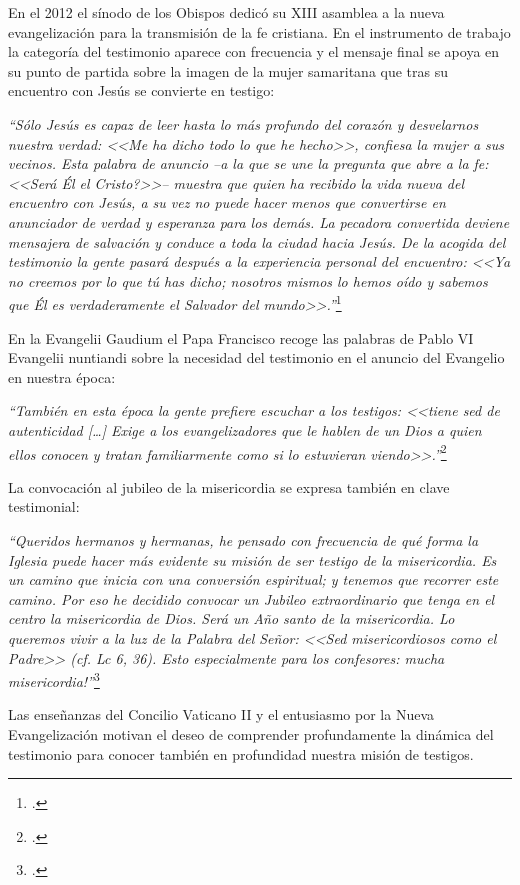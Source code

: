 \documentclass[../main.tex]{subfiles}
\begin{document}
En el 2012 el sínodo de los Obispos dedicó su XIII asamblea a la nueva evangelización para la transmisión de la fe cristiana. En el instrumento de trabajo la categoría del testimonio aparece con frecuencia y el mensaje final se apoya en su punto de partida sobre la imagen de la mujer samaritana que tras su encuentro con Jesús se convierte en testigo:

\emph{``Sólo Jesús es capaz de leer hasta lo más profundo del corazón y desvelarnos nuestra verdad: <<Me ha dicho todo lo que he hecho>>, confiesa la mujer a sus vecinos. Esta palabra de anuncio --a la que se une la pregunta que abre a la fe: <<\textquestiondown{}Será Él el Cristo?>>-- muestra que quien ha recibido la vida nueva del encuentro con Jesús, a su vez no puede hacer menos que convertirse en anunciador de verdad y esperanza para los demás. La pecadora convertida deviene mensajera de salvación y conduce a toda la ciudad hacia Jesús. De la acogida del testimonio la gente pasará después a la experiencia personal del encuentro: <<Ya no creemos por lo que tú has dicho; nosotros mismos lo hemos oído y sabemos que Él es verdaderamente el Salvador del mundo>>.''}\footcite{sinod}

En la Evangelii Gaudium el Papa Francisco recoge las palabras de Pablo VI Evangelii nuntiandi sobre la necesidad del testimonio en el anuncio del Evangelio en nuestra época:

\emph{``También en esta época la gente prefiere escuchar a los testigos: <<tiene sed de autenticidad [\ldots] Exige a los
evangelizadores que le hablen de un Dios a quien ellos conocen y tratan familiarmente como si lo
estuvieran viendo>>.''}\footcite[n. 150]{EG}

La convocación al jubileo de la misericordia se expresa también en clave testimonial:

\emph{``Queridos hermanos y hermanas, he pensado con frecuencia de qué forma la Iglesia puede hacer más evidente su misión de ser testigo de la misericordia. Es un camino que inicia con una conversión espiritual; y tenemos que recorrer este camino. Por eso he decidido convocar un Jubileo extraordinario que tenga en el centro la misericordia de Dios. Será un Año santo de la misericordia. Lo queremos vivir a la luz de la Palabra del Señor: <<Sed misericordiosos como el Padre>> (cf. Lc 6, 36). Esto especialmente para los confesores: \textexclamdown{}mucha misericordia!''}\footcite{fran_mis}

Las enseñanzas del Concilio Vaticano II y el entusiasmo por la Nueva Evangelización motivan el deseo de comprender profundamente la dinámica del testimonio para conocer también en profundidad nuestra misión de testigos. 
\end{document}
